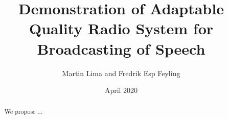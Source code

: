 \documentclass[9pt,journal]{IEEEtran}
\title{Demonstration of Adaptable Quality Radio System for Broadcasting of Speech}
\author{Martin Lima and Fredrik Esp Feyling }
\date{April 2020}
\begin{document}
\maketitle
\begin{abstract} 
We propose ... 
\end{abstract}






\end{document}
